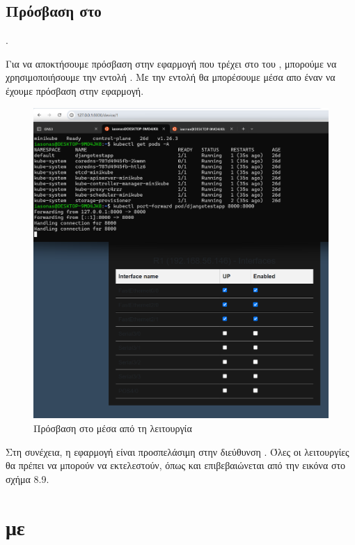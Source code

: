 \FloatBarrier

\subsection{Πρόσβαση στο }.

Για να αποκτήσουμε πρόσβαση στην εφαρμογή  που τρέχει στο  του , 
μπορούμε να χρησιμοποιήσουμε την εντολή . Με την εντολή  θα μπορέσουμε μέσα απο έναν 
να έχουμε πρόσβαση στην εφαρμογή.

\FloatBarrier

\begin{figure}[h]
	\centering
	\includegraphics[width=1.0\textwidth]{graphics/kubernetes_proxy.png}
	\caption{Πρόσβαση στο  μέσα από τη λειτουργία }
\end{figure}

\FloatBarrier

\noindent  Στη συνέχεια, η εφαρμογή είναι προσπελάσιμη στην διεύθυνση . Όλες οι λειτουργίες θα πρέπει να μπορούν να εκτελεστούν, όπως και επιβεβαιώνεται από την εικόνα στο σχήμα 8.9.

\section{ με }

